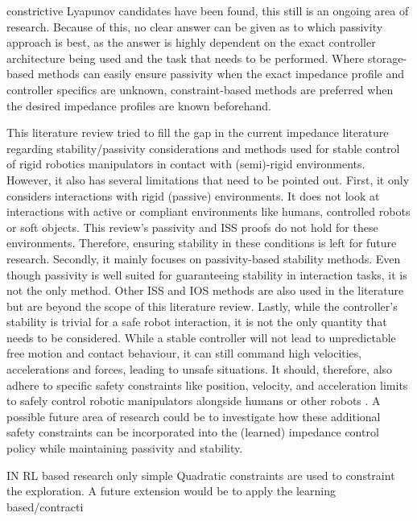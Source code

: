 constrictive Lyapunov candidates have been found, this still is an ongoing area of research. Because of this, no clear answer can be given as to which passivity approach is best, as the answer is highly dependent on the exact controller architecture being used and the task that needs to be performed. Where storage-based methods can easily ensure passivity when the exact impedance profile and controller specifics are unknown, constraint-based methods are preferred when the desired impedance profiles are known beforehand.

This literature review tried to fill the gap in the current impedance literature regarding stability/passivity considerations and methods used for stable control of rigid robotics manipulators in contact with (semi)-rigid environments. However, it also has several limitations that need to be pointed out. First, it only considers interactions with rigid (passive) environments. It does not look at interactions with active or compliant environments like humans, controlled robots or soft objects. This review's passivity and ISS proofs do not hold for these environments. Therefore, ensuring stability in these conditions is left for future research. Secondly, it mainly focuses on passivity-based stability methods. Even though passivity is well suited for guaranteeing stability in interaction tasks, it is not the only method. Other ISS and IOS methods are also used in the literature but are beyond the scope of this literature review. Lastly, while the controller's stability is trivial for a safe robot interaction, it is not the only quantity that needs to be considered. While a stable controller will not lead to unpredictable free motion and contact behaviour, it can still command high velocities, accelerations and forces, leading to unsafe situations. It should, therefore, also adhere to specific safety constraints like position, velocity, and acceleration limits to safely control robotic manipulators alongside humans or other robots \cite{lasotaSurveyMethodsSafe2017,chowLyapunovbasedApproachSafe2018,sadanandananandSafeLearningControl2021,sharkawyHumanRobotInteraction2022}. A possible future area of research could be to investigate how these additional safety constraints can be incorporated into the (learned) impedance control policy while maintaining passivity and stability.



IN RL based research only simple Quadratic constraints are used to constraint the exploration. A future extension would be to apply the learning based/contracti


